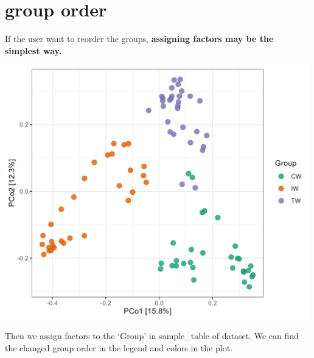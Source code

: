 \documentclass[
]{book}
\newenvironment{Shaded}{\begin{snugshade}}{\end{snugshade}}
\newcommand{\AttributeTok}[1]{\textcolor[rgb]{0.77,0.63,0.00}{#1}}
\newcommand{\FunctionTok}[1]{\textcolor[rgb]{0.00,0.00,0.00}{#1}}
\newcommand{\NormalTok}[1]{#1}
\newcommand{\OtherTok}[1]{\textcolor[rgb]{0.56,0.35,0.01}{#1}}
\newcommand{\SpecialCharTok}[1]{\textcolor[rgb]{0.00,0.00,0.00}{#1}}
\newcommand{\StringTok}[1]{\textcolor[rgb]{0.31,0.60,0.02}{#1}}
\begin{document}
\hypertarget{group-order}{%
\section{group order}\label{group-order}}

If the user want to reorder the groups, \textbf{assigning factors may be the simplest way.}

\begin{Shaded}
\end{Shaded}

\begin{center}\includegraphics[width=500px]{Images/Notes_group_order_1} \end{center}

Then we assign factors to the `Group' in sample\_table of dataset.
We can find the changed group order in the legend and colors in the plot.
\end{document}
